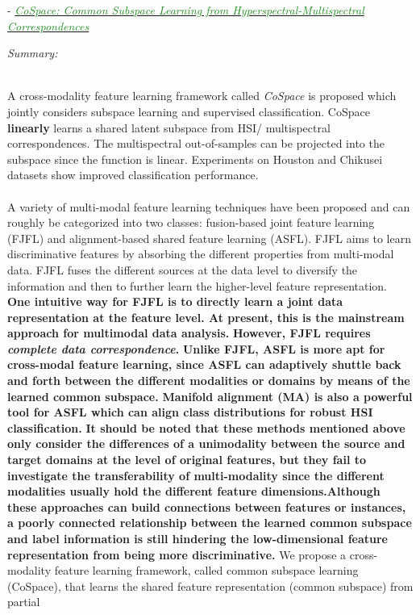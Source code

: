 \documentclass[]{article}
\newcommand{\paperentry}[4]{
            \hangindent=1cm
            \textcolor{red}{\cite{#1}} - \href{run:../References/#3}{\textcolor{ForestGreen}{\textit{#2}}}
            
            \noindent            
            \begin{minipage}[t]{0.1\linewidth}\hfill\end{minipage}
            \begin{minipage}[t]{0.8\linewidth}\textcolor{NavyBlue}{{\textit{Summary:}}}#4\end{minipage}
            \vspace{.25cm}
          }
\begin{document}
		\paperentry{Hong2018CommonSubspaceLearningHSI}
		{CoSpace: Common Subspace Learning from Hyperspectral-Multispectral Correspondences}
		{Manifold_Representation_Learning/Alignment/Hong2018CommonSubspaceLearningHSI.pdf}
		{}\\
		A cross-modality feature learning framework called \textit{CoSpace} is proposed which jointly considers subspace learning and supervised classification.  CoSpace \textbf{linearly} learns a shared latent subspace from HSI/ multispectral correspondences.  The multispectral out-of-samples can be projected into the subspace since the function is linear.  Experiments on Houston and Chikusei datasets show improved classification performance.
		\\ \\
		A variety of multi-modal feature learning techniques have been proposed and can roughly be categorized into two classes: fusion-based joint feature learning (FJFL) and alignment-based shared feature learning (ASFL).  FJFL aims to learn discriminative features by absorbing the different properties from multi-modal data.  FJFL fuses the different sources at the data level to diversify the information and then to further learn the higher-level feature representation.  \textbf{One intuitive way for FJFL is to directly learn a joint data representation at the feature level.  \large{At present, this is the mainstream approach for multimodal data analysis.}}  \textbf{However, FJFL requires \textit{complete data correspondence}.}  \textbf{Unlike FJFL, ASFL is more apt for cross-modal feature learning, since ASFL can adaptively shuttle back and forth between the different modalities or domains by means of the learned common subspace.}  \textbf{\large{Manifold alignment (MA) is also a powerful tool for ASFL which can align class distributions for robust HSI classification.}} \textbf{It should be noted that these methods mentioned above	only consider the differences of a unimodality between the source and target domains at the level of original features, but they fail to investigate the transferability of multi-modality since the different modalities usually hold the different feature dimensions.Although these approaches can build connections between features or instances, a poorly connected relationship between the learned common subspace and label information is still hindering the low-dimensional feature representation from being more discriminative.}	 We propose a cross-modality feature learning framework,
		called common subspace learning (CoSpace), that learns the shared feature representation (common subspace) from partial
\end{document}
